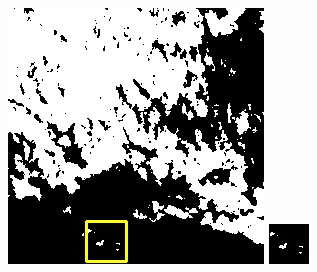 \documentclass[10pt]{ctexart}
\begin{document}
\begin{multicols}{2}
\begin{figure}[H]
{\begin{minipage}[b]{0.15\linewidth}
            \includegraphics[width=1\linewidth]{../log/spoon2/cut2/LC81620432014072LGN00_16237_mask.jpg}\vspace{4pt}
            \includegraphics[width=1\linewidth]{../log/spoon2/cut2/tmp_cut_LC81620432014072LGN00_16237_mask.jpg}\vspace{4pt}

\end{minipage}}
\end{figure}
\end{multicols}
\end{document}
